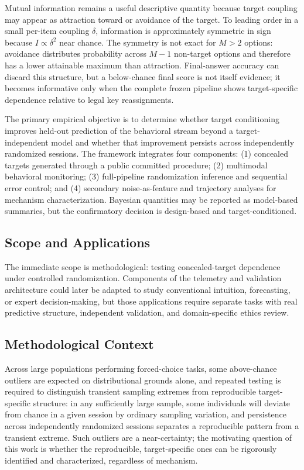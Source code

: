\documentclass[11pt,letterpaper]{article}
\begin{document}
Mutual information remains a useful descriptive quantity because target coupling may appear as attraction toward or avoidance of the target. To leading order in a small per-item coupling $\delta$, information is approximately symmetric in sign because $I\propto\delta^2$ near chance. The symmetry is not exact for $M>2$ options: avoidance distributes probability across $M-1$ non-target options and therefore has a lower attainable maximum than attraction. Final-answer accuracy can discard this structure, but a below-chance final score is not itself evidence; it becomes informative only when the complete frozen pipeline shows target-specific dependence relative to legal key reassignments.

The primary empirical objective is to determine whether target conditioning improves held-out prediction of the behavioral stream beyond a target-independent model and whether that improvement persists across independently randomized sessions. The framework integrates four components: (1) concealed targets generated through a public committed procedure; (2) multimodal behavioral monitoring; (3) full-pipeline randomization inference and sequential error control; and (4) secondary noise-as-feature and trajectory analyses for mechanism characterization. Bayesian quantities may be reported as model-based summaries, but the confirmatory decision is design-based and target-conditioned.

\subsection{Scope and Applications}

The immediate scope is methodological: testing concealed-target dependence under controlled randomization. Components of the telemetry and validation architecture could later be adapted to study conventional intuition, forecasting, or expert decision-making, but those applications require separate tasks with real predictive structure, independent validation, and domain-specific ethics review.

\subsection{Methodological Context}

Across large populations performing forced-choice tasks, some above-chance outliers are expected on distributional grounds alone, and repeated testing is required to distinguish transient sampling extremes from reproducible target-specific structure: in any sufficiently large sample, some individuals will deviate from chance in a given session by ordinary sampling variation, and persistence across independently randomized sessions separates a reproducible pattern from a transient extreme. Such outliers are a near-certainty; the motivating question of this work is whether the reproducible, target-specific ones can be rigorously identified and characterized, regardless of mechanism.
\end{document}
